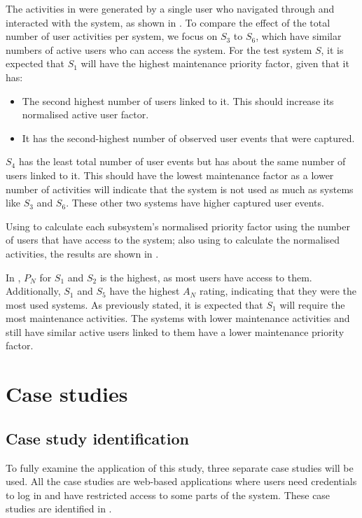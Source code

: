 The activities in  were generated by a single user who navigated through and interacted with the system, as shown in . To compare the effect of the total number of user activities per system, we focus on $S_3$ to $S_6$, which have similar numbers of active users who can access the system. For the test system $S$, it is expected that $S_1$ will have the highest maintenance priority factor, given that it has:

\begin{itemize}
	\item The second highest number of users linked to it. This should increase its normalised active user factor.
	\item It has the second-highest number of observed user events that were captured.
\end{itemize}

$S_4$ has the least total number of user events but has about the same number of users linked to it. This should have the lowest maintenance factor as a lower number of activities will indicate that the system is not used as much as systems like $S_3$ and $S_6$. These other two systems have higher captured user events.\par Using  to calculate each subsystem's normalised priority factor using the number of users that have access to the system; also using  to calculate the normalised activities, the results are shown in .



In , $P_N$ for $S_1$ and $S_2$ is the highest, as most users have access to them. Additionally, $S_1$ and $S_5$ have the highest $A_N$ rating, indicating that they were the most used systems. As previously stated, it is expected that $S_1$ will require the most maintenance activities. The systems with lower maintenance activities and still have similar active users linked to them have a lower maintenance priority factor.

\clearpage

\section{Case studies}\label{sec:ch3_caseStudies}

\subsection{Case study identification}
To fully examine the application of this study, three separate case studies will be used. All the case studies are web-based applications where users need credentials to log in and have restricted access to some parts of the system. These case studies are identified in .

